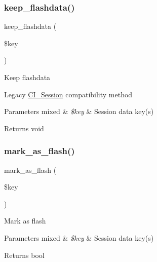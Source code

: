 \subsubsection{\texorpdfstring{keep\+\_\+flashdata()}{keep\_flashdata()}}
{\footnotesize\ttfamily keep\+\_\+flashdata (\begin{DoxyParamCaption}\item[{}]{\$key }\end{DoxyParamCaption})}

Keep flashdata

Legacy \mbox{\hyperlink{class_c_i___session}{C\+I\+\_\+\+Session}} compatibility method


\begin{DoxyParams}[1]{Parameters}
mixed & {\em \$key} & Session data key(s) \\
\hline
\end{DoxyParams}
\begin{DoxyReturn}{Returns}
void 
\end{DoxyReturn}
\mbox{\label{class_c_i___session_a81fdbc2498fc26532aee037f03dbaf55}} 
\subsubsection{\texorpdfstring{mark\+\_\+as\+\_\+flash()}{mark\_as\_flash()}}
{\footnotesize\ttfamily mark\+\_\+as\+\_\+flash (\begin{DoxyParamCaption}\item[{}]{\$key }\end{DoxyParamCaption})}

Mark as flash


\begin{DoxyParams}[1]{Parameters}
mixed & {\em \$key} & Session data key(s) \\
\hline
\end{DoxyParams}
\begin{DoxyReturn}{Returns}
bool 
\end{DoxyReturn}
\mbox{\label{class_c_i___session_ab55f3c6806c359d98edd6138ef33ecf0}} 
